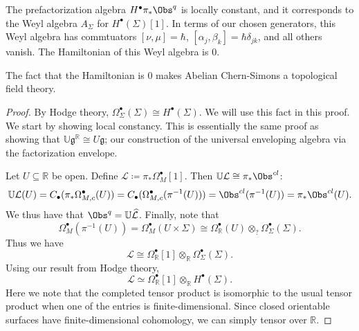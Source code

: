 \begin{proposition}\label{prp:4-5-3}
	The prefactorization algebra $H^{\bullet} \pi _*\Obs^{q} $ is locally constant, and it corresponds to the Weyl algebra $A_\Sigma $ for $H^{\bullet} (\Sigma )[1]$. In terms of our chosen generators, this Weyl algebra has commtuators $[\nu,\mu ]=\hbar $, $[\alpha _j,\beta _k]=\hbar \delta _{jk} $, and all others vanish. The Hamiltonian of this Weyl algebra is 0.
\end{proposition}

The fact that the Hamiltonian is 0 makes Abelian Chern-Simons a topological field theory.

\begin{proof}
	By Hodge theory, $\Omega ^{\bullet} _\Sigma (\Sigma ) \cong H^{\bullet} (\Sigma )$. We will use this fact in this proof. We start by showing local constancy. This is essentially the same proof as showing that $\mathbb{U} \mathfrak{g} ^{\mathbb{R} } \cong U\mathfrak{g} $; our construction of the universal enveloping algebra via the factorization envelope.

	Let $U\subseteq \mathbb{R} $ be open. Define $\mathcal{L} \coloneqq \pi _* \Omega _M^{\bullet} [1]$. Then $\mathbb{U} \mathcal{L} \cong \pi _* \Obs^{cl} $:
	\[
		\mathbb{U} \mathcal{L} (U) = C_{\bullet} (\pi _* \Omega ^{\bullet} _{M,c} (U))=C_{\bullet} (\Omega ^{\bullet} _{M,c} (\pi ^{-1} (U))) = \Obs^{cl} (\pi ^{-1} (U))=\pi _*\Obs^{cl} (U)
	.\]
	We thus have that $\Obs^{q} = \mathbb{U}\widehat{\mathcal{L} }$. Finally, note that
	\[
		\Omega ^{\bullet}_M(\pi ^{-1} (U)) = \Omega ^{\bullet} _M(U\times \Sigma ) \cong \Omega ^{\bullet} _\mathbb{R} (U)\otimes _{?} \Omega ^{\bullet} _\Sigma (\Sigma )
	.\]
	Thus we have
	\[
		\mathcal{L} \cong \Omega ^{\bullet} _\mathbb{R} [1]\otimes _{\mathbb{R}} \Omega ^{\bullet} _\Sigma (\Sigma )
	.\]
	Using our result from Hodge theory,
	\[
		\mathcal{L} \simeq \Omega ^{\bullet} _{\mathbb{R} } [1]\otimes _{\mathbb{R} } H^{\bullet} (\Sigma )
	.\]
	Here we note that the completed tensor product is isomorphic to the usual tensor product when one of the entries is finite-dimensional. Since closed orientable surfaces have finite-dimensional cohomology, we can simply tensor over $\mathbb{R} $.


\end{proof}
